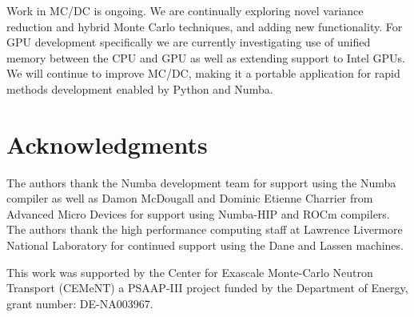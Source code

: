 Work in MC/DC is ongoing.
We are continually exploring novel variance reduction and hybrid Monte Carlo techniques, and adding new functionality.
For GPU development specifically we are currently investigating use of unified memory between the CPU and GPU as well as extending support to Intel GPUs.
We will continue to improve MC/DC, making it a portable application for rapid methods development enabled by Python and Numba.

\section{Acknowledgments}
The authors thank the Numba development team for support using the Numba compiler as well as Damon McDougall and Dominic Etienne Charrier from Advanced Micro Devices for support using Numba-HIP and ROCm compilers.
The authors thank the high performance computing staff at Lawrence Livermore National Laboratory for continued support using the Dane and Lassen machines.

This work was supported by the Center for Exascale Monte-Carlo Neutron Transport (CEMeNT) a PSAAP-III project funded by the Department of Energy, grant number: DE-NA003967.